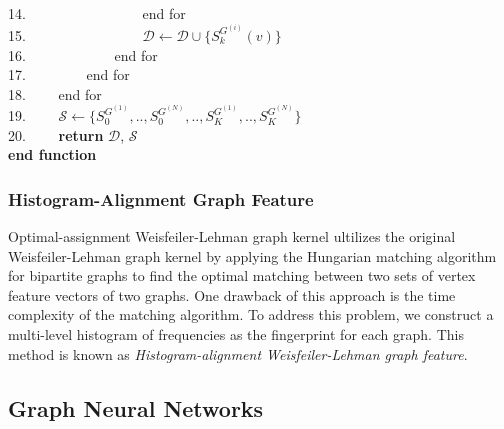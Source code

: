\documentclass[a4paper]{article}
\begin{document}
14. \ \ \ \ \ \ \ \ \ \ \ \ \ \ \ \ end for \\
15. \ \ \ \ \ \ \ \ \ \ \ \ \ \ \ \ $\mathcal{D} \leftarrow \mathcal{D} \cup \{S^{G^{(i)}}_k(v)\}$ \\
16. \ \ \ \ \ \ \ \ \ \ \ \ end for \\
17. \ \ \ \ \ \ \ \ end for \\
18. \ \ \ \ end for \\
19. \ \ \ \ $\mathcal{S} \leftarrow \{S^{G^{(1)}}_0, .., S^{G^{(N)}}_0, .., S^{G^{(1)}}_K, .., S^{G^{(N)}}_K\}$ \\
20. \ \ \ \ \textbf{return} $\mathcal{D}$, $\mathcal{S}$ \\
\textbf{end function}

\subsubsection{Histogram-Alignment Graph Feature}

Optimal-assignment Weisfeiler-Lehman graph kernel \cite{Nils} ultilizes the original Weisfeiler-Lehman graph kernel by applying the Hungarian matching algorithm for bipartite graphs to find the optimal matching between two sets of vertex feature vectors of two graphs. One drawback of this approach is the time complexity of the matching algorithm. To address this problem, we construct a multi-level histogram of frequencies as the fingerprint for each graph. This method is known as \textit{Histogram-alignment Weisfeiler-Lehman graph feature}. 

\subsection{Graph Neural Networks}
\end{document}
